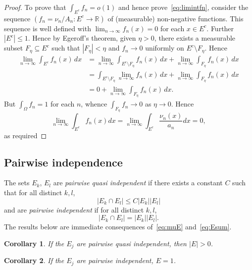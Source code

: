 \documentclass[reqno]{amsart}
\newtheorem{cor}{Corollary}
\renewcommand{\le}{\leqslant}
\newcommand{\R}{{\mathbb{R}}}
\newcommand{\0}{{\mathbf{0}}}
\begin{document}
\begin{proof}
To prove that $\int_{E^c} f_n=o(1)$
and hence prove~\eqref{eq:limintfn}, consider the sequence
$(f_n=\nu_n/A_n\colon E^c\to \R)$ of (measurable) non-negative
functions.
This sequence is well defined with $\lim_{n\to\infty} f_n(x)=0$ for
each $x\in E^c$.  Further $|E^c|\le1$.  Hence by Egeroff's theorem,
given $\eta>0$, there exists a measurable subset $F_\eta\subseteq E^c$
such that $|F_\eta|<\eta$ and $f_n\to 0$ uniformly on $E^c\setminus
F_\eta$.  Hence
\begin{align*}
  \lim_{n\to\infty} \int_{E^c} f_n(x) \, dx&=  
  \lim_{n\to\infty} \int_{E^c\setminus F_\eta} f_n(x) \, dx + 
  \lim_{n\to\infty} \int_{ F_\eta} f_n(x) \, dx \\
 &=   \int_{E^c\setminus F_\eta}\lim_{n\to\infty} f_n(x) \, dx + 
  \lim_{n\to\infty} \int_{ F_\eta} f_n(x) \, dx\\
 &= 0 +\lim_{n\to\infty} \int_{ F_\eta} f_n(x) \, dx.
\end{align*}
But $\int_\Omega f_n=1$ for each $n$, whence $\int_{F_\eta} f_n\to 0$ as
$\eta \to 0$. Hence
$$
\lim_{n\to\infty} \int_{E^c} f_n(x) dx =\lim_{n\to\infty} \int_{E^c} \frac{\nu_n(x)}{a_n} dx = 0, 
$$
as required
\end{proof}

\subsection*{Pairwise independence}
The sets $E_k$, $E_l$ are {\em pairwise quasi independent} if there
exists a constant $C$ such that for all distinct $k,l$,
 \begin{equation*}
   |E_k\cap E_l| \le C |E_k||E_l| 
\end{equation*}
and are {\em pairwise independent} if for all distinct $k,l$,
 \begin{equation*}
   |E_k\cap E_l| = |E_k||E_l|. 
\end{equation*}
The results below are immediate consequences of~\eqref{eq:muE}
and~\eqref{eq:Esum}. 
 \begin{cor}
\label{cor:pwqi}
   If the $E_j$ are pairwise quasi independent, then $|E|>0$.
\end{cor}
 \begin{cor}
\label{cor:pwi}
   If the $E_j$ are pairwise  independent, $E=1$.
\end{cor}
\end{document}
